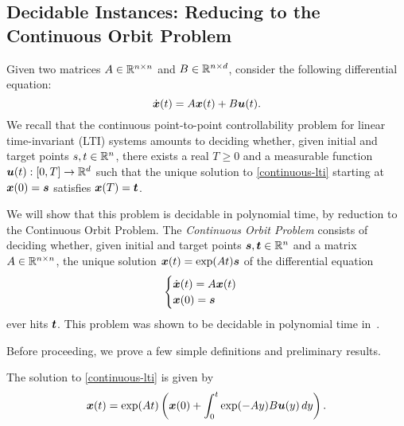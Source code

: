 \subsection{Decidable Instances: Reducing to the Continuous Orbit Problem}

\label{continuous-decidability}

Given two matrices $A \in \mathbb{R}^{n \times n}$ and $B \in \mathbb{R}^{n \times d}$, consider the following differential equation:
\begin{equation}
\label{continuous-lti}
\dot{\myvector{x}}(t) = A \myvector{x}(t) + B \myvector{u}(t) .
\end{equation}
We recall that the continuous point-to-point controllability problem for linear time-invariant (LTI) systems amounts to deciding whether, given initial and target points $s,t \in \mathbb{R}^{n}$, there exists a real $T\geq 0$ and a measurable function $\boldsymbol{u}(t) : [0,T] \rightarrow \mathbb{R}^{d}$ such that the unique solution to \cref{continuous-lti} starting at $\boldsymbol{x}(0) = \boldsymbol{s}$ satisfies $\boldsymbol{x}(T) = \boldsymbol{t}$.

We will show that this problem is decidable in polynomial time, by reduction to the Continuous Orbit Problem. The \emph{Continuous Orbit Problem} consists of deciding whether, given initial and target points $\boldsymbol{s}, \boldsymbol{t} \in \mathbb{R}^{n}$ and a matrix $A \in \mathbb{R}^{n \times n}$, the unique solution $\boldsymbol{x}(t) = \exp(A t) \boldsymbol{s}$ of the differential equation
\begin{equation}
\begin{cases}
\dot{\boldsymbol{x}}(t) = A \boldsymbol{x}(t) \\
\boldsymbol{x}(0) = \boldsymbol{s}
\end{cases}
\end{equation}
ever hits $\boldsymbol{t}$. This problem was shown to be decidable in polynomial time in~\cite{Hainry08, ContinuousOrbitIPL}.

Before proceeding, we prove a few simple definitions and preliminary results.

\begin{lemma}
\label{closed-form-solution}
The solution to \cref{continuous-lti} is given by
\begin{equation*}
\boldsymbol{x}(t) = \exp(At) \left( \boldsymbol{x}(0) + \int_{0}^{t} \exp(-Ay) B \boldsymbol{u}(y) \, dy \right).
\end{equation*}
\end{lemma}

